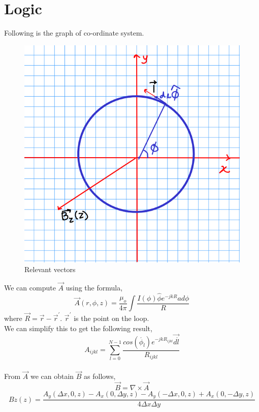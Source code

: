 \documentclass[11pt, a4paper]{article}
\begin{document}
\section{Logic}
Following is the graph of co-ordinate system.
\begin{figure}[!tbh]
   	\centering
   	\includegraphics[scale=0.5]{figure.png}  %
   	\caption{Relevant vectors}
   	\label{fig:sample}
   \end{figure}
 We can compute $\vec{A}$ using the formula,
 \begin{equation}\label{eq:1}
\vec{A}(r, \phi, z) = \frac{\mu_o}{4\pi}\int\frac{I(\phi)\hat{\phi}e^{-jkR}ad\phi}{R}
\end{equation}
where $\vec{R} = \vec{r} - \vec{r}^{'}$. $\vec{r}^{'}$ is the point on the loop.\\
We can simplify this to get the following result,
\begin{equation}\label{eq:1}
A_{ijkl}= \sum_{l=0}^{N-1}\frac{cos(\acute{\phi_{l}}) e^{-jkR_{ijkl}}\vec{d\acute{l}}}{R_{ijkl}}
\end{equation}\\

From $\vec{A}$ we can obtain $\vec{B}$ as follows,
\begin{equation}
\vec{B} = \nabla \times \vec{A}  
\end{equation}
\begin{equation}
Bz(z) = \frac{A_y(\Delta x,0,z) - A_x(0,\Delta y,z) - A_y(-\Delta x,0,z) + A_x(0,-\Delta y,z)}{4 \Delta x \Delta y}
\end{equation}
\newpage
\end{document}
